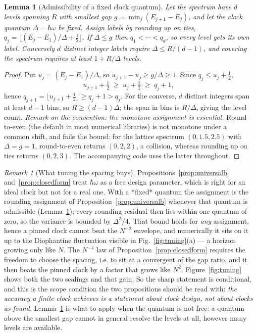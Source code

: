 \documentclass[aps,prd,onecolumn,notitlepage,10pt,amsmath,amssymb,amsfonts,nofootinbib]{revtex4-2}
\newtheorem{lemma}{Lemma}
\theoremstyle{definition}
\theoremstyle{remark}
\newtheorem{remark}{Remark}
\begin{document}
\begin{lemma}[Admissibility of a fixed clock quantum]
\label{lem:admissible}
Let the spectrum have $d$ levels spanning $R$ with smallest gap $g=\min_j(E_{j+1}-E_j)$, and let the clock quantum $\Delta=\hbar\omega$ be fixed. Assign labels by rounding \emph{up} on ties, $q_j=\lfloor (E_j-E_1)/\Delta+\tfrac12\rfloor$. If $\Delta\le g$ then $q_1<\cdots<q_d$, so every level gets its own label. Conversely $d$ distinct integer labels require $\Delta\le R/(d-1)$, and covering the spectrum requires at least $1+R/\Delta$ levels.
\end{lemma}
\begin{proof}
Put $u_j=(E_j-E_1)/\Delta$, so $u_{j+1}-u_j\ge g/\Delta\ge1$. Since $q_j\le u_j+\tfrac12$,
\[
u_{j+1}+\tfrac12\;\ge\;u_j+\tfrac32\;\ge\;q_j+1 ,
\]
hence $q_{j+1}=\lfloor u_{j+1}+\tfrac12\rfloor\ge q_j+1>q_j$. For the converse, $d$ distinct integers span at least $d-1$ bins, so $R\ge(d-1)\Delta$; the span in bins is $R/\Delta$, giving the level count.
\emph{Remark on the convention: the monotone assignment is essential.} Round-to-even (the default in most numerical libraries) is not monotone under a common shift, and fails the bound: for the lattice spectrum $(0,1.5,2.5)$ with $\Delta=g=1$, round-to-even returns $(0,2,2)$, a collision, whereas rounding up on ties returns $(0,2,3)$. The accompanying code uses the latter throughout.
\end{proof}

\begin{remark}[What tuning the spacing buys]
\label{rem:tuning}
Propositions~\ref{prop:universalb} and~\ref{prop:closedform} treat $\hbar\omega$ as a free design parameter, which is right for an ideal clock but not for a real one. With a *fixed* quantum the assignment is the rounding assignment of Proposition~\ref{prop:universalb} whenever that quantum is admissible (Lemma~\ref{lem:admissible}); every rounding residual then lies within one quantum of zero, so the variance is bounded by $\Delta^2/4$. That bound holds for \emph{any} assignment, hence a pinned clock cannot beat the $N^{-2}$ envelope, and numerically it sits on it up to the Diophantine fluctuation visible in Fig.~\ref{fig:tuning}(a) --- a horizon growing only like $N$. The $N^{-4}$ law of Proposition~\ref{prop:closedform} requires the freedom to choose the spacing, i.e. to sit at a convergent of the gap ratio, and it then beats the pinned clock by a factor that grows like $N^2$. Figure~\ref{fig:tuning} shows both the two scalings and that gain. So the sharp statement is conditional, and this is the scope condition the two propositions should be read with: \emph{the accuracy a finite clock achieves is a statement about clock design, not about clocks as found.} Lemma~\ref{lem:admissible} is what to apply when the quantum is not free: a quantum above the smallest gap cannot in general resolve the levels at all, however many levels are available.
\end{remark}
\end{document}
